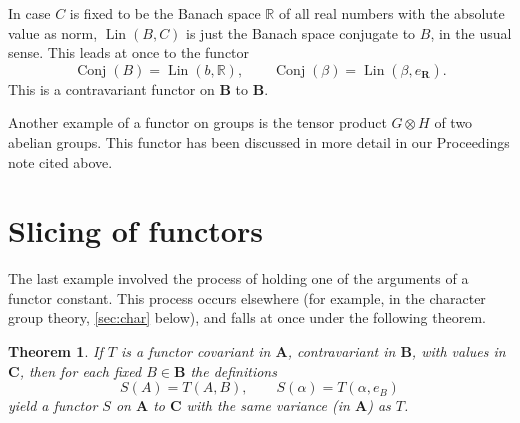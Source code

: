 \documentclass[11pt,a4paper]{report}
\newtheorem{theorem}{Theorem}
\newcommand{\R}{\mathbb{R}}
\DeclareMathOperator{\lin}{Lin}
\DeclareMathOperator{\dual}{Conj}
\begin{document}
In case $C$ is fixed to be the Banach space $\R$ of all real numbers with the absolute value as norm, $\lin(B,C)$ is just
the Banach space conjugate to $B$, in the usual sense. This leads at once to the functor
\begin{equation*}
	\dual(B)= \lin(b,\R),\qquad \dual(\beta)= \lin(\beta,e_\mathbf{R}).
\end{equation*}
This is a contravariant functor on $\mathbf{B}$ to $\mathbf{B}$.

Another example of a functor on groups is the tensor product $G\otimes H$ of two abelian groups. This functor has been
discussed in more detail in our Proceedings note cited above.

\section{Slicing of functors}\label{sec:funct_slice}
The last example involved the process of holding one of the arguments of a functor constant. This process occurs
elsewhere (for example, in the character group theory, \cref{sec:char} below), and falls at once under the following
theorem.
\begin{theorem}\label{thm:currying}
	If  $T$ is a functor covariant in $\mathbf{A}$, contravariant in $\mathbf{B}$, with values in $\mathbf{C}$,
	then for each fixed $B\in\mathbf{B}$ the definitions
	\begin{equation*}
		S(A)= T(A,B),\qquad S(\alpha)= T(\alpha,e_B)
	\end{equation*}
	yield a functor $S$ on $\mathbf{A}$ to $\mathbf{C}$ with the same variance (in $\mathbf{A}$) as $T$.
\end{theorem}
\end{document}
